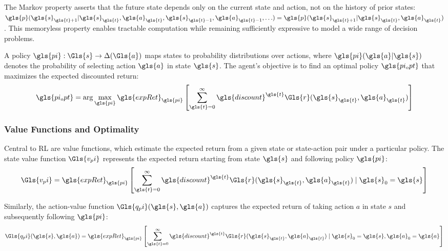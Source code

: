 The Markov property asserts that the future state depends only on the current 
state and action, not on the history of prior states: 
\(
    \gls{p}(\gls{s}_{\gls{t}+1} | \gls{s}_{\gls{t}}, \gls{a}_{\gls{t}}, 
    \gls{s}_{\gls{t}-1}, \gls{a}_{\gls{t}-1}, \ldots) 
    = \gls{p}(\gls{s}_{\gls{t}+1} | \gls{s}_{\gls{t}}, \gls{a}_{\gls{t}})
\). 
This memoryless property enables tractable computation while 
remaining sufficiently expressive to model a wide range of decision problems.

A policy \(\gls{pi}: {\Gls{s}} \rightarrow \Delta({\Gls{a}})\) maps 
states to probability distributions over actions, where \(\gls{pi}(\gls{a}|\gls{s})\) 
denotes the probability of selecting action \(\gls{a}\) in state \(\gls{s}\). 
The agent's objective is to find an optimal policy \(\gls{pi_opt}\) that maximizes 
the expected discounted return:
\begin{equation}
    \gls{pi_opt} = \arg\max_{\gls{pi}} \gls{expRet}_{\gls{pi}} \left[ \sum_{\gls{t}=0}^{\infty} 
        \gls{discount}^{\gls{t}} \Gls{r}(\gls{s}_{\gls{t}}, \gls{a}_{\gls{t}}) \right]
\end{equation}

\subsubsection{Value Functions and Optimality}

Central to RL are value functions, which estimate the expected return 
from a given state or state-action pair under a particular policy. 
The state value function \(\Gls{v_pi}\) represents the expected return 
starting from state \(\gls{s}\) and following policy \(\gls{pi}\):
\begin{equation}
    \Gls{v_pi} = \gls{expRet}_{\gls{pi}} \left[ \sum_{\gls{t}=0}^{\infty} 
        \gls{discount}^{\gls{t}} \Gls{r}(\gls{s}_{\gls{t}}, \gls{a}_{\gls{t}}) 
        \mid \gls{s}_0 = \gls{s} \right]
\end{equation}

Similarly, the action-value function \(\Gls{q_pi}(\gls{s},\gls{a})\) captures 
the expected return of taking action $a$ in state $s$ and subsequently following \(\gls{pi}\):
\begin{equation}
    \Gls{q_pi}(\gls{s}, \gls{a}) = \gls{expRet}_{\gls{pi}} \left[ \sum_{\gls{t}=0}^{\infty}
        \gls{discount}^{\gls{t}} \Gls{r}(\gls{s}_{\gls{t}}, \gls{a}_{\gls{t}}) 
        \mid \gls{s}_0 = \gls{s}, \gls{a}_0 = \gls{a} \right]
\end{equation}

